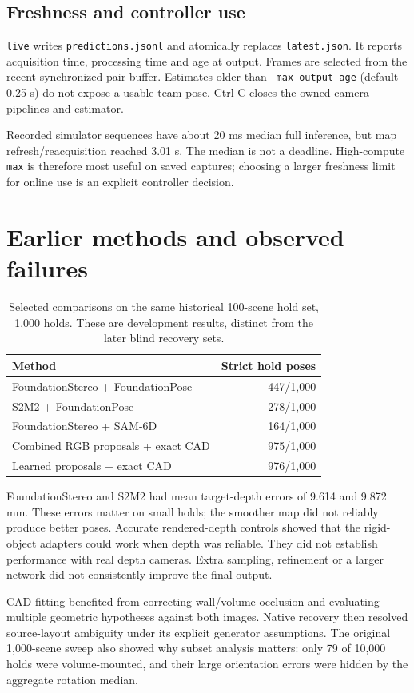\documentclass[11pt,a4paper]{article}
\begin{document}
\subsection{Freshness and controller use}
\texttt{live} writes \texttt{predictions.jsonl} and atomically replaces
\texttt{latest.json}. It reports acquisition time, processing time and age at
output. Frames are selected from the recent synchronized pair buffer. Estimates
older than \texttt{--max-output-age} (default 0.25 s) do not expose a usable team
pose. Ctrl-C closes the owned camera pipelines and estimator.

Recorded simulator sequences have about 20 ms median full inference, but map
refresh/reacquisition reached 3.01 s. The median is not a deadline. High-compute
\texttt{max} is therefore most useful on saved captures; choosing a larger
freshness limit for online use is an explicit controller decision.

\section{Earlier methods and observed failures}
\begin{table}[htbp]\centering
\caption{Selected comparisons on the same historical 100-scene hold set, 1,000 holds. These are development results, distinct from the later blind recovery sets.}
\begin{tabularx}{\linewidth}{@{}Yr@{}}\toprule
Method & Strict hold poses\\\midrule
FoundationStereo + FoundationPose &447/1,000\\
S2M2 + FoundationPose &278/1,000\\
FoundationStereo + SAM-6D &164/1,000\\
Combined RGB proposals + exact CAD &975/1,000\\
Learned proposals + exact CAD &976/1,000\\\bottomrule
\end{tabularx}
\end{table}
FoundationStereo and S2M2 had mean target-depth errors of 9.614 and 9.872 mm.
These errors matter on small holds; the smoother map did not reliably produce
better poses. Accurate rendered-depth controls showed that the rigid-object
adapters could work when depth was reliable. They did not establish performance
with real depth cameras. Extra sampling, refinement or a larger network did
not consistently improve the final output.

CAD fitting benefited from correcting wall/volume occlusion and evaluating
multiple geometric hypotheses against both images. Native recovery then
resolved source-layout ambiguity under its explicit generator assumptions.
The original 1,000-scene sweep also showed why subset analysis matters: only 79
of 10,000 holds were volume-mounted, and their large orientation errors were
hidden by the aggregate rotation median.
\end{document}
